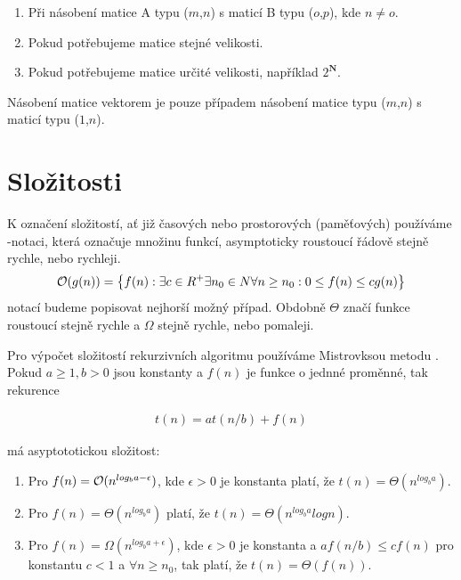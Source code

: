 \begin{enumerate}
  \item Při násobení matice A typu ($m$,$n$) s maticí B typu ($o$,$p$), kde $ n \neq o $.
  \item Pokud potřebujeme matice stejné velikosti.
  \item Pokud potřebujeme matice určité velikosti, například $ 2^{ \mathbf{N}} $.
\end{enumerate}

Násobení matice vektorem je pouze případem násobení matice typu ($m$,$n$) s maticí typu ($1$,$n$).

\section{Složitosti}

K označení složitostí, ať již časových nebo prostorových (paměťových) používáme \bigO-notaci, která označuje množinu funkcí, asymptoticky roustoucí řádově stejně rychle, nebo rychleji.
\begin{align}
\mathcal{O}(g(n)) = \left\{ f(n) : \exists c \in R^+ \exists n_0 \in N \forall n \geq n_0 : 0 \leq f(n) \leq cg(n) \right\}
\end{align}
\bigO notací budeme popisovat nejhorší možný případ. Obdobně $\Theta$ značí funkce roustoucí stejně rychle a $\Omega$ stejně rychle, nebo pomaleji.


Pro výpočet složitostí rekurzivních algoritmu používáme Mistrovksou metodu \cite{Cormen:2001:IA:580470}. Pokud $a \geq 1, b > 0$ jsou konstanty a $f(n)$ je funkce o jednné proměnné, tak rekurence

\begin{align}
t(n) = at(n/b)+f(n)
\end{align}

má asyptototickou složitost:

\begin{enumerate}
  \item Pro $f(n) = \mathcal{O}(n^{log_b{a - \epsilon}})$, kde $\epsilon > 0$ je konstanta platí, že $t(n)=\Theta(n^{log_b{a}})$.
  \item Pro $f(n) = \Theta(n^{log_b{a}})$ platí, že $t(n)=\Theta(n^{log_b{a}}log{n})$.
  \item Pro $f(n) = \Omega(n^{log_b{a + \epsilon}})$, kde $\epsilon > 0$ je konstanta a $af(n/b) \leq cf(n)$ pro konstantu $c < 1$ a $\forall n\geq n_0$, tak platí, že $t(n)=\Theta(f(n))$.
\end{enumerate}

